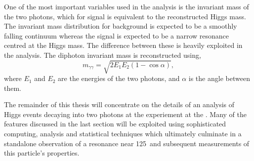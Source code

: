One of the most important variables used in the analysis is the invariant mass of the two photons, which for signal is equivalent to the reconstructed Higgs mass. The invariant mass distribution for background is expected to be a smoothly falling continuum whereas the signal is expected to be a narrow resonance centred at the Higgs mass. The difference between these is heavily exploited in the analysis. The diphoton invariant mass is reconstructed using,
\begin{equation}
	m_{\gamma\gamma} = \sqrt{2E_{1}E_{2}(1-\cos\alpha)},
\label{eq:invmass}
\end{equation}
where $E_{1}$ and $E_{2}$ are the energies of the two photons, and $\alpha$ is the angle between them.

The remainder of this thesis will concentrate on the details of an analysis of Higgs events decaying into two photons at the \CMS experiement at the \LHC. Many of the features discussed in the last section will be exploited using sophisticated computing, analysis and statistical techniques which ultimately culminate in a standalone observation of a resonance near 125~\GeV and subsequent measurements of this particle's properties.

